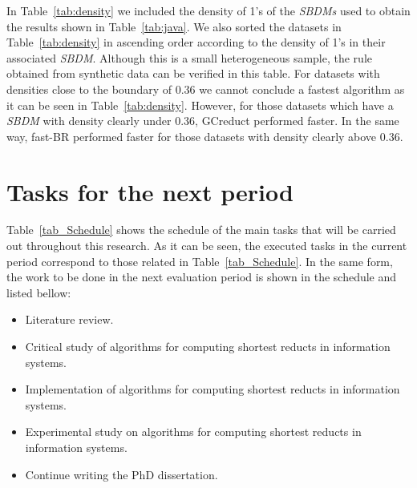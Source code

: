 \documentclass[authoryear,11pt]{elsarticle}
\begin{document}
  In Table~\ref{tab:density} we included the density of 1's of the \textit{SBDMs} used to obtain the results shown in Table~\ref{tab:java}. We also sorted the datasets in Table~\ref{tab:density} in ascending order according to the density of 1's in their associated \textit{SBDM}. Although this is a small heterogeneous sample, the rule obtained from synthetic data can be verified in this table. For datasets with densities close to the boundary of 0.36 we cannot conclude a fastest algorithm as it can be seen in Table~\ref{tab:density}. However, for those datasets which have a \textit{SBDM} with density clearly under 0.36, GCreduct performed faster. In the same way, fast-BR performed faster for those datasets with density clearly above 0.36.

\section{Tasks for the next period}\label{sec_schedule}
  Table~\ref{tab_Schedule} shows the schedule of the main tasks that will be carried out throughout this research. As it can be seen, the executed tasks in the current period correspond to those related in Table~\ref{tab_Schedule}. In the same form, the work to be done in the next evaluation period is shown in the schedule and listed bellow:
  
  \begin{itemize}
  	\itemsep0em 
  	\item Literature review.
  	\item Critical study of algorithms for computing shortest reducts in information systems.
  	\item Implementation of algorithms for computing shortest reducts in information systems.
  	\item Experimental study on algorithms for computing shortest reducts in information systems.
  	\item Continue writing the PhD dissertation.
  \end{itemize}
  
\end{document}
